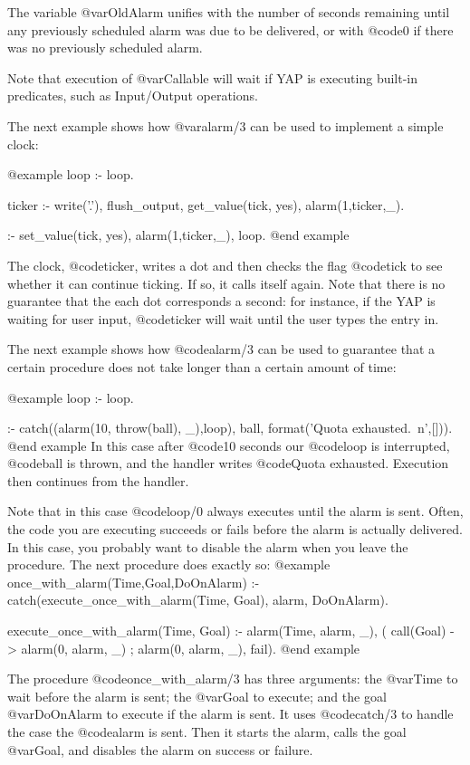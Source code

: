 {{{{{{The variable @var{OldAlarm} unifies with the number of seconds remaining
until any previously scheduled alarm was due to be delivered, or with
@code{0} if there was no previously scheduled alarm.

Note that execution of @var{Callable} will wait if YAP is
executing built-in predicates, such as Input/Output operations.

The next example shows how @var{alarm/3} can be used to implement a
simple clock:

@example
loop :- loop.

ticker :- write('.'), flush_output,
          get_value(tick, yes),
          alarm(1,ticker,_).

:- set_value(tick, yes), alarm(1,ticker,_), loop.
@end example

The clock, @code{ticker}, writes a dot and then checks the flag
@code{tick} to see whether it can continue ticking. If so, it calls
itself again. Note that there is no guarantee that the each dot
corresponds a second: for instance, if the YAP is waiting for
user input, @code{ticker} will wait until the user types the entry in.

The next example shows how @code{alarm/3} can be used to guarantee that
a certain procedure does not take longer than a certain amount of time:

@example
loop :- loop.

:-   catch((alarm(10, throw(ball), _),loop),
        ball,
        format('Quota exhausted.~n',[])).
@end example
In this case after @code{10} seconds our @code{loop} is interrupted,
@code{ball} is thrown,  and the handler writes @code{Quota exhausted}.
Execution then continues from the handler.

Note that in this case @code{loop/0} always executes until the alarm is
sent. Often, the code you are executing succeeds or fails before the
alarm is actually delivered. In this case, you probably want to disable
the alarm when you leave the procedure. The next procedure does exactly so:
@example
once_with_alarm(Time,Goal,DoOnAlarm) :-
   catch(execute_once_with_alarm(Time, Goal), alarm, DoOnAlarm).

execute_once_with_alarm(Time, Goal) :-
        alarm(Time, alarm, _),
        ( call(Goal) -> alarm(0, alarm, _) ; alarm(0, alarm, _), fail).
@end example

The procedure @code{once_with_alarm/3} has three arguments:
the @var{Time} to wait before the alarm is
sent; the @var{Goal} to execute; and the goal @var{DoOnAlarm} to execute
if the alarm is sent. It uses @code{catch/3} to handle the case the
@code{alarm} is sent. Then it starts the alarm, calls the goal
@var{Goal}, and disables the alarm on success or failure.

}}}}}}
